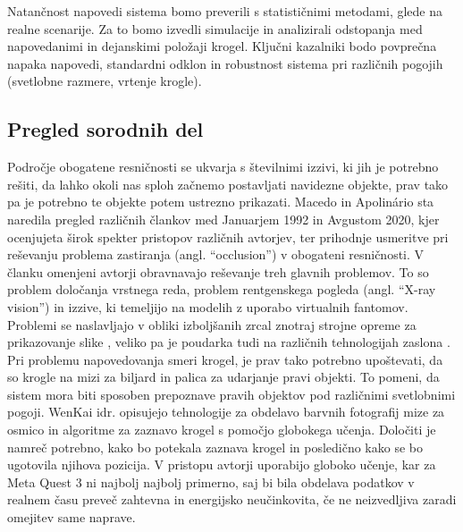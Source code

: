 \documentclass[a4paper, 12pt]{article}
\newcommand\cmnt[1]{\textcolor{munsell}{#1}}
\begin{document}
Natančnost napovedi sistema bomo preverili s statističnimi metodami, glede na realne scenarije. Za to bomo izvedli simulacije in analizirali odstopanja med napovedanimi in dejanskimi položaji krogel. Ključni kazalniki bodo povprečna napaka napovedi, standardni odklon in robustnost sistema pri različnih pogojih (svetlobne razmere, vrtenje krogle).


\subsection{Pregled sorodnih del}
Področje obogatene resničnosti se ukvarja s številnimi izzivi, ki jih je potrebno rešiti, da lahko okoli nas sploh začnemo postavljati navidezne objekte, prav tako pa je potrebno te objekte potem ustrezno prikazati.
Macedo in Apolinário \cite{Macedo2023Occlusion} sta naredila pregled različnih člankov med Januarjem 1992 in Avgustom 2020,  kjer  ocenjujeta širok spekter pristopov različnih avtorjev, ter prihodnje usmeritve pri reševanju problema zastiranja (angl. ``occlusion'') v obogateni resničnosti. V članku omenjeni avtorji \cite{Krajancich2020Factored} obravnavajo reševanje 
treh glavnih problemov. To so problem določanja vrstnega reda, problem rentgenskega pogleda (angl. ``X-ray vision'') in izzive, ki temeljijo na modelih z uporabo virtualnih fantomov. Problemi se naslavljajo v obliki izboljšanih zrcal znotraj strojne opreme za prikazovanje slike \cite{Krajancich2020Factored}, veliko pa je poudarka tudi na različnih tehnologijah zaslona \cite{Zhang2023AddOn}.\\
Pri problemu napovedovanja smeri krogel, je prav tako potrebno upoštevati, da so krogle na mizi za biljard in palica za udarjanje pravi objekti. To pomeni, da sistem mora biti sposoben prepoznave pravih objektov pod različnimi svetlobnimi pogoji. WenKai idr. \cite{WenKai2024} opisujejo tehnologije za
obdelavo barvnih fotografij mize za osmico in algoritme za zaznavo krogel s pomočjo globokega učenja. Določiti je namreč potrebno, kako bo potekala zaznava krogel in posledično kako se bo ugotovila njihova pozicija. V pristopu avtorji uporabijo globoko učenje, kar za Meta
Quest 3 ni najbolj najbolj primerno, saj bi bila obdelava podatkov v realnem času preveč zahtevna in energijsko neučinkovita, če ne neizvedljiva zaradi omejitev same naprave.
\end{document}
